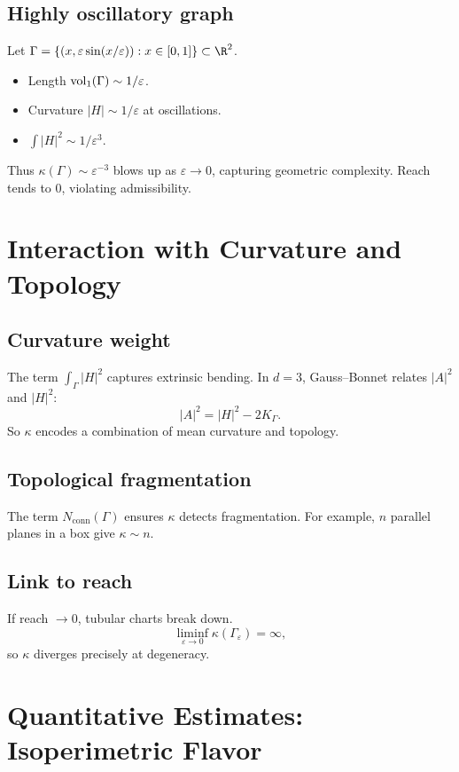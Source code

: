\subsection{Highly oscillatory graph}
Let $\Gamma=\{(x,\varepsilon\sin(x/\varepsilon)): x\in[0,1]\}\subset \R^2$.
\begin{itemize}
\item Length $\operatorname{vol}_1(\Gamma)\sim 1/\varepsilon$.
\item Curvature $|H|\sim 1/\varepsilon$ at oscillations.
\item $\int |H|^2\sim 1/\varepsilon^3$.
\end{itemize}
Thus $\kappa(\Gamma)\sim \varepsilon^{-3}$ blows up as $\varepsilon\to 0$,
capturing geometric complexity. Reach tends to 0, violating admissibility.

\section{Interaction with Curvature and Topology}
\label{sec:curvature-topology}

\subsection{Curvature weight}
The term $\int_\Gamma |H|^2$ captures extrinsic bending.
In $d=3$, Gauss–Bonnet relates $|A|^2$ and $|H|^2$:
\[
|A|^2 = |H|^2 - 2K_\Gamma.
\]
So $\kappa$ encodes a combination of mean curvature and topology.

\subsection{Topological fragmentation}
The term $N_{\mathrm{conn}}(\Gamma)$ ensures $\kappa$ detects fragmentation.
For example, $n$ parallel planes in a box give $\kappa\sim n$.

\subsection{Link to reach}
If reach $\to 0$, tubular charts break down.
\[
\liminf_{\varepsilon\to 0} \kappa(\Gamma_\varepsilon)=\infty,
\]
so $\kappa$ diverges precisely at degeneracy.

\section{Quantitative Estimates: Isoperimetric Flavor}
\label{sec:isoperimetric}

